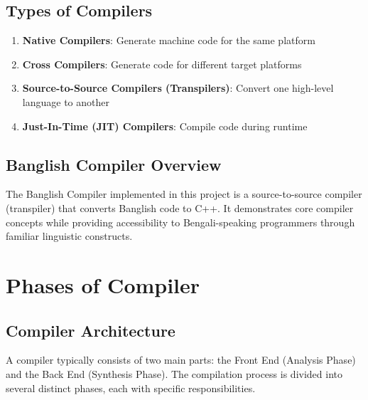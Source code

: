 \documentclass[12pt,a4paper]{article}
\begin{document}
\subsection{Types of Compilers}

\begin{enumerate}
    \item \textbf{Native Compilers}: Generate machine code for the same platform
    \item \textbf{Cross Compilers}: Generate code for different target platforms
    \item \textbf{Source-to-Source Compilers (Transpilers)}: Convert one high-level language to another
    \item \textbf{Just-In-Time (JIT) Compilers}: Compile code during runtime
\end{enumerate}

\subsection{Banglish Compiler Overview}

The Banglish Compiler implemented in this project is a source-to-source compiler (transpiler) that converts Banglish code to C++. It demonstrates core compiler concepts while providing accessibility to Bengali-speaking programmers through familiar linguistic constructs.

\section{Phases of Compiler}

\subsection{Compiler Architecture}

A compiler typically consists of two main parts: the Front End (Analysis Phase) and the Back End (Synthesis Phase). The compilation process is divided into several distinct phases, each with specific responsibilities.
\end{document}
